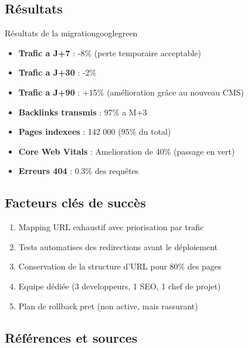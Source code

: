 \documentclass[12pt,a4paper,twoside]{report}
\begin{document}
\subsection{Résultats}

\begin{mybox}{Résultats de la migration}{googlegreen}
\begin{itemize}
    \item \textbf{Trafic a J+7} : -8\% (perte temporaire acceptable)
    \item \textbf{Trafic a J+30} : -2\%
    \item \textbf{Trafic a J+90} : +15\% (amélioration grâce au nouveau CMS)
    \item \textbf{Backlinks transmis} : 97\% a M+3
    \item \textbf{Pages indexees} : 142 000 (95\% du total)
    \item \textbf{Core Web Vitals} : Amelioration de 40\% (passage en vert)
    \item \textbf{Erreurs 404} : 0.3\% des requêtes
\end{itemize}
\end{mybox}

\subsection{Facteurs clés de succès}

\begin{enumerate}
    \item Mapping URL exhaustif avec priorisation par trafic
    \item Tests automatises des redirections avant le déploiement
    \item Conservation de la structure d'URL pour 80\% des pages
    \item Equipe dédiée (3 developpeurs, 1 SEO, 1 chef de projet)
    \item Plan de rollback pret (non active, mais rassurant)
\end{enumerate}

\subsection{Références et sources}
\end{document}
